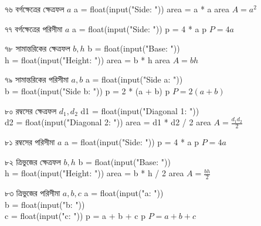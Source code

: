 
\formulaexercise
{৭৬}
{বর্গক্ষেত্রের ক্ষেত্রফল}
{\(a\)}
{a = float(input("Side: "))}
{area = a * a}
{area}
{\(A=a^2\)}


\formulaexercise
{৭৭}
{বর্গক্ষেত্রের পরিসীমা}
{\(a\)}
{a = float(input("Side: "))}
{p = 4 * a}
{p}
{\(P=4a\)}


\formulaexercise
{৭৮}
{সামান্তরিকের ক্ষেত্রফল}
{\(b,h\)}
{b = float(input("Base: "))\\
h = float(input("Height: "))}
{area = b * h}
{area}
{\(A=bh\)}


\formulaexercise
{৭৯}
{সামান্তরিকের পরিসীমা}
{\(a,b\)}
{a = float(input("Side a: "))\\
b = float(input("Side b: "))}
{p = 2 * (a + b)}
{p}
{\(P=2(a+b)\)}


\formulaexercise
{৮০}
{রম্বসের ক্ষেত্রফল}
{\(d_1,d_2\)}
{d1 = float(input("Diagonal 1: "))\\
d2 = float(input("Diagonal 2: "))}
{area = d1 * d2 / 2}
{area}
{\(A=\frac{d_1d_2}{2}\)}


\formulaexercise
{৮১}
{রম্বসের পরিসীমা}
{\(a\)}
{a = float(input("Side: "))}
{p = 4 * a}
{p}
{\(P=4a\)}


\formulaexercise
{৮২}
{ত্রিভুজের ক্ষেত্রফল}
{\(b,h\)}
{b = float(input("Base: "))\\
h = float(input("Height: "))}
{area = b * h / 2}
{area}
{\(A=\frac{bh}{2}\)}


\formulaexercise
{৮৩}
{ত্রিভুজের পরিসীমা}
{\(a,b,c\)}
{a = float(input("a: "))\\
b = float(input("b: "))\\
c = float(input("c: "))}
{p = a + b + c}
{p}
{\(P=a+b+c\)}

